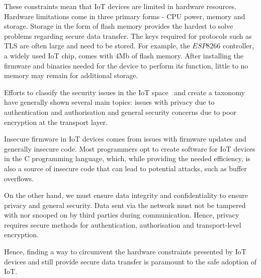 These constraints mean that IoT devices are limited in hardware resources.
Hardware limitations come in three primary forms - CPU power, memory and storage.
Storage in the form of flash memory provides the hardest to solve problems regarding secure data transfer.
The keys required for protocols such as TLS are often large and need to be stored.
For example, the $ESP8266$ controller, a widely used IoT chip, comes with $4$Mb of flash memory.
After installing the firmware and binaries needed for the device to perform its function, little to no memory may remain for additional storage.

Efforts to classify the security issues in the IoT space~\citep{alaba_internet_2017,gupta_security_2021,swamy_security_2017} and create a taxonomy have generally shown several main topics: issues with privacy due to authentication and authorisation and general security concerns due to poor encryption at the transport layer.

Insecure firmware in IoT devices comes from issues with firmware updates and generally insecure code.
Most programmers opt to create software for IoT devices in the C programming language, which, while providing the needed efficiency, is also a source of insecure code that can lead to potential attacks, such as buffer overflows.

On the other hand, we must ensure data integrity and confidentiality to ensure privacy and general security.
Data sent via the network must not be tampered with nor snooped on by third parties during communication.
Hence, privacy requires secure methods for authentication, authorisation and transport-level encryption.

Hence, finding a way to circumvent the hardware constraints presented by IoT devices and still provide secure data transfer is paramount to the safe adoption of IoT.